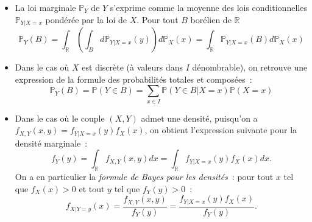 \begin{proposition}\label{III-balcond}

\begin{itemize}
\tightlist
\item
  La loi marginale \(\mathbb{P}_Y\) de \(Y\) s'exprime comme la moyenne
  des lois conditionnelles \(\mathbb{P}_{Y|X=x}\) pondérée par la loi de
  \(X\). Pour tout \(B\) borélien de \(\mathbb{R}\)
  \[\mathbb{P}_Y(B) = \int_\mathbb{R}\left( \int_{B} d\mathbb{P}_{Y|X=x}(y) \right) d\mathbb{P}_X(x) = \int_\mathbb{R}\mathbb{P}_{Y|X=x}(B) d\mathbb{P}_X(x)\]
\item
  Dans le cas où \(X\) est discrète (à valeurs dans \(I\) dénombrable),
  on retrouve une expression de la formule des probabilités totales et
  composées~:
  \[\mathbb{P}_Y(B) = \mathbb{P}(Y\in B) = \sum_{x \in I} \mathbb{P}(Y \in B | X = x)\mathbb{P}(X=x)\]
\item
  Dans le cas où le couple \((X,Y)\) admet une densité, puisqu'on a
  \(f_{X,Y}(x,y) = f_{Y | X=x}(y)f_X(x)\), on obtient l'expression
  suivante pour la densité marginale~:
  \[f_Y(y) = \int_\mathbb{R}f_{X,Y}(x,y)dx = \int_\mathbb{R}f_{Y | X=x}(y)f_X(x) dx.\]
  On a en particulier la \emph{formule de Bayes pour les densités}~:
  pour tout \(x\) tel que \(f_X(x) > 0\) et tout \(y\) tel que
  \(f_Y(y) > 0\)~:
  \[ f_{X|Y=y}(x) = \frac{f_{X,Y}(x,y)}{f_Y(y)} = \frac{f_{Y|X=x}(y)f_X(x)}{f_Y(y)} .\]
\end{itemize}
\end{proposition}

